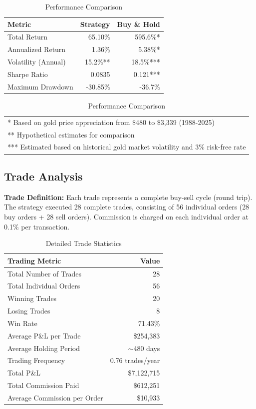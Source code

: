 \documentclass[11pt,a4paper]{article}
\begin{document}
\begin{table}[H]
\centering
\begin{tabular}{lrr}
\toprule
\textbf{Metric} & \textbf{Strategy} & \textbf{Buy \& Hold} \\
\midrule
Total Return & \textcolor{profit}{65.10\%} & \textcolor{profit}{595.6\%}* \\
Annualized Return & \textcolor{profit}{1.36\%} & \textcolor{profit}{5.38\%}* \\
Volatility (Annual) & 15.2\%** & 18.5\%*** \\
Sharpe Ratio & 0.0835 & 0.121*** \\
Maximum Drawdown & \textcolor{loss}{-30.85\%} & \textcolor{loss}{-36.7\%} \\
\bottomrule
\end{tabular}
\caption{Performance Comparison}
\label{tab:performance}
\begin{tabular}{p{\textwidth}}
\footnotesize
* Based on gold price appreciation from \$480 to \$3,339 (1988-2025)\\
** Hypothetical estimates for comparison\\
*** Estimated based on historical gold market volatility and 3\% risk-free rate
\end{tabular}
\end{table}

\subsection{Trade Analysis}

\textbf{Trade Definition:} Each trade represents a complete buy-sell cycle (round trip). The strategy executed 28 complete trades, consisting of 56 individual orders (28 buy orders + 28 sell orders). Commission is charged on each individual order at 0.1\% per transaction.

\begin{table}[H]
\centering
\begin{tabular}{lr}
\toprule
\textbf{Trading Metric} & \textbf{Value} \\
\midrule
Total Number of Trades & 28 \\
Total Individual Orders & 56 \\
Winning Trades & 20 \\
Losing Trades & 8 \\
Win Rate & \textcolor{profit}{71.43\%} \\
Average P\&L per Trade & \textcolor{profit}{\$254,383} \\
Average Holding Period & $\sim$480 days \\
Trading Frequency & 0.76 trades/year \\
Total P\&L & \textcolor{profit}{\$7,122,715} \\
Total Commission Paid & \textcolor{loss}{\$612,251} \\
Average Commission per Order & \textcolor{loss}{\$10,933} \\
\bottomrule
\end{tabular}
\caption{Detailed Trade Statistics}
\end{table}
\end{document}
